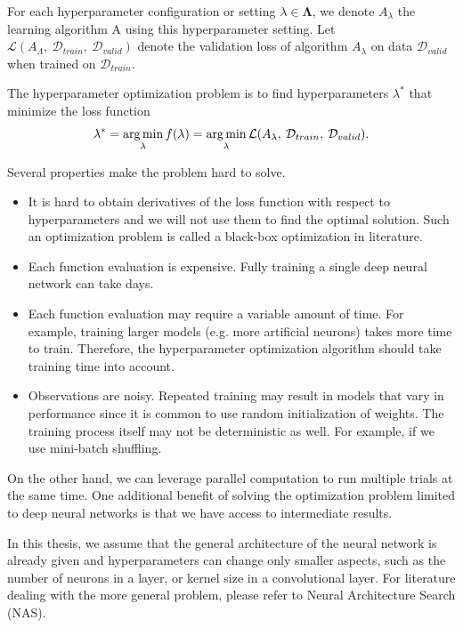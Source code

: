 For each hyperparameter configuration or setting $\lambda \in \mathbf{\Lambda}$, we denote $A_\lambda$ the learning algorithm A using this hyperparameter setting. Let $\mathcal{L}(A_\Lambda, \: \mathcal{D}_{train}, \: \mathcal{D}_{valid})$ denote the validation loss of algorithm $A_\lambda$ on data $\mathcal{D}_{valid}$ when trained on $\mathcal{D}_{train}$.

\begin{defn}\label{defn:x}
The hyperparameter optimization problem is to find hyperparameters $\lambda^*$ that minimize the loss function  \[\lambda^*=\operatorname*{arg\,min} _\lambda f(\lambda)=\operatorname*{arg\,min}_\lambda \mathcal{L}(A_\lambda, \: \mathcal{D}_{train}, \:  \mathcal{D}_{valid}).\]
\end{defn}

Several properties make the problem hard to solve.
\begin{itemize}
    \item It is hard to obtain derivatives of the loss function with respect to hyperparameters and we will not use them to find the optimal solution. Such an optimization problem is called a black-box optimization in literature.
    \item Each function evaluation is expensive. Fully training a single deep neural network can take days.
    \item Each function evaluation may require a variable amount of time. For example, training larger models (e.g. more artificial neurons) takes more time to train. Therefore, the hyperparameter optimization algorithm should take training time into account.
    \item Observations are noisy. Repeated training may result in models that vary in performance since it is common to use random initialization of weights. The training process itself may not be deterministic as well. For example, if we use mini-batch shuffling.
\end{itemize}

On the other hand, we can leverage parallel computation to run multiple trials at the same time. One additional benefit of solving the optimization problem limited to deep neural networks is that we have access to intermediate results.


In this thesis, we assume that the general architecture of the neural network is already given and hyperparameters can change only smaller aspects, such as the number of neurons in a layer, or kernel size in a convolutional layer. For literature dealing with the more general problem, please refer to Neural Architecture Search (NAS).

